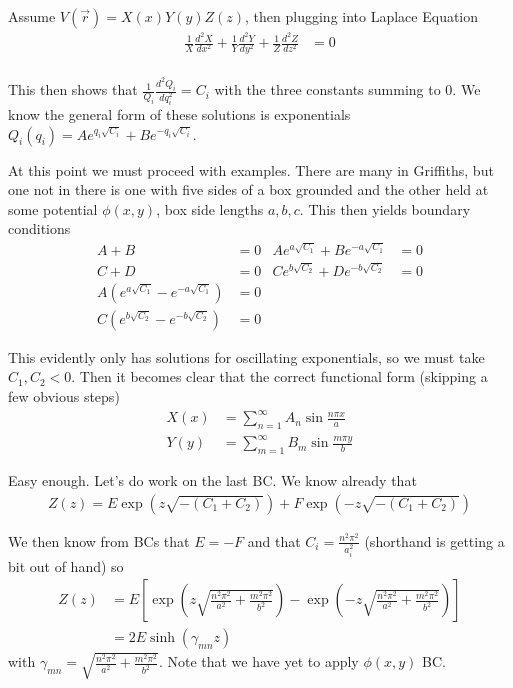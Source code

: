 \documentclass[10pt]{report}
\newcommand{\rtd}[2]{\frac{d^2#1}{d#2^2}}
\begin{document}
Assume $V(\vec{r}) = X(x)Y(y)Z(z)$, then plugging into Laplace Equation
\begin{align}
    \frac{1}{X}\rtd{X}{x} + \frac{1}{Y}\rtd{Y}{y} + \frac{1}{Z}\rtd{Z}{z} &= 0\\
\end{align}

This then shows that $\frac{1}{Q_i}\rtd{Q_i}{q_i} = C_i$ with the three constants summing to $0$. We know the general form of these solutions is exponentials $Q_i(q_i) = Ae^{q_i\sqrt{C_i}} + Be^{-q_i\sqrt{C_i}}$.

At this point we must proceed with examples. There are many in Griffiths, but one not in there is one with five sides of a box grounded and the other held at some potential $\phi(x,y)$, box side lengths $a,b,c$. This then yields boundary conditions
\begin{align}
    A+B &= 0 & Ae^{a\sqrt{C_1}} + Be^{-a\sqrt{C_1}} &= 0\\
    C+D &= 0 & Ce^{b\sqrt{C_2}} + De^{-b\sqrt{C_2}} &= 0\\
    A\left( e^{a\sqrt{C_1}}  - e^{-a\sqrt{C_1}} \right) &= 0\\
    C\left( e^{b\sqrt{C_2}} - e^{-b\sqrt{C_2}} \right) &= 0
\end{align}

This evidently only has solutions for oscillating exponentials, so we must take $C_1, C_2 < 0$. Then it becomes clear that the correct functional form (skipping a few obvious steps)
\begin{align}
    X(x) &= \sum_{n=1}^{\infty}A_n\sin \frac{n\pi x}{a}\\
    Y(y) &= \sum_{m=1}^{\infty}B_m\sin \frac{m\pi y}{b}
\end{align}

Easy enough. Let's do work on the last BC. We know already that 
\begin{align}
    Z(z) = E\exp\left( z\sqrt{-(C_1 + C_2)} \right) + F\exp\left( -z\sqrt{-\left( C_1 + C_2 \right)} \right)
\end{align}

We then know from BCs that $E=-F$ and that $C_i = \frac{n^2\pi^2}{a_i^2}$ (shorthand is getting a bit out of hand) so
\begin{align}
    Z(z) &= E\left[ \exp\left( z\sqrt{\frac{n^2\pi^2}{a^2} + \frac{m^2\pi^2}{b^2}} \right) - \exp\left( -z\sqrt{\frac{n^2\pi^2}{a^2} + \frac{m^2\pi^2}{b^2}} \right)\right]\\
    &= 2E\sinh(\gamma_{mn}z)
\end{align}
with $\gamma_{mn} = \sqrt{\frac{n^2\pi^2}{a^2} + \frac{m^2\pi^2}{b^2}}$. Note that we have yet to apply $\phi(x,y)$ BC.
\end{document}
